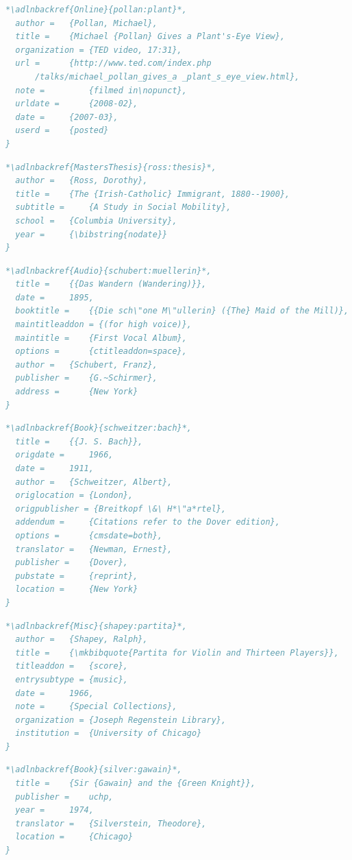 \documentclass[a4paper,12pt]{article}
\begin{document}
\begin{lstlisting}[language=BibTeX,label=pollan:plant]
*\adlnbackref{Online}{pollan:plant}*,
  author = 	 {Pollan, Michael},
  title = 	 {Michael {Pollan} Gives a Plant's-Eye View},
  organization = {TED video, 17:31},
  url = 	 {http://www.ted.com/index.php
      /talks/michael_pollan_gives_a _plant_s_eye_view.html},
  note =         {filmed in\nopunct},
  urldate = 	 {2008-02},
  date = 	 {2007-03},
  userd = 	 {posted}
}
\end{lstlisting}
\begin{lstlisting}[language=BibTeX,label=ross:thesis]
*\adlnbackref{MastersThesis}{ross:thesis}*,
  author = 	 {Ross, Dorothy},
  title = 	 {The {Irish-Catholic} Immigrant, 1880--1900},
  subtitle = 	 {A Study in Social Mobility},
  school = 	 {Columbia University},
  year = 	 {\bibstring{nodate}}
}
\end{lstlisting}
\begin{lstlisting}[language=BibTeX,label=schubert:muellerin]
*\adlnbackref{Audio}{schubert:muellerin}*,
  title = 	 {{Das Wandern (Wandering)}},
  date = 	 1895,
  booktitle = 	 {{Die sch\"one M\"ullerin} ({The} Maid of the Mill)},
  maintitleaddon = {(for high voice)},
  maintitle = 	 {First Vocal Album},
  options = 	 {ctitleaddon=space},
  author = 	 {Schubert, Franz},
  publisher =    {G.~Schirmer},
  address = 	 {New York}
}
\end{lstlisting}
\begin{lstlisting}[language=BibTeX,label=schweitzer:bach]
*\adlnbackref{Book}{schweitzer:bach}*,
  title = 	 {{J. S. Bach}},
  origdate = 	 1966,
  date = 	 1911,
  author = 	 {Schweitzer, Albert},
  origlocation = {London},
  origpublisher = {Breitkopf \&\ H*\"a*rtel},
  addendum = 	 {Citations refer to the Dover edition},
  options = 	 {cmsdate=both},
  translator = 	 {Newman, Ernest},
  publisher =    {Dover},
  pubstate = 	 {reprint},
  location =     {New York}
}
\end{lstlisting}
\begin{lstlisting}[language=BibTeX,label=shapey:partita]
*\adlnbackref{Misc}{shapey:partita}*,
  author = 	 {Shapey, Ralph},
  title = 	 {\mkbibquote{Partita for Violin and Thirteen Players}},
  titleaddon = 	 {score},
  entrysubtype = {music},
  date = 	 1966,
  note = 	 {Special Collections},
  organization = {Joseph Regenstein Library},
  institution =  {University of Chicago}
}
\end{lstlisting}
\begin{lstlisting}[language=BibTeX,label=silver:gawain]
*\adlnbackref{Book}{silver:gawain}*,
  title = 	 {Sir {Gawain} and the {Green Knight}},
  publisher = 	 uchp,
  year = 	 1974,
  translator = 	 {Silverstein, Theodore},
  location =     {Chicago}
}
\end{lstlisting}
\end{document}
